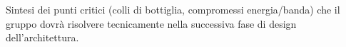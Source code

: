 \begin{center}
	Sintesi dei punti critici (colli di bottiglia, compromessi energia/banda) che il 
	gruppo dovrà risolvere tecnicamente nella successiva fase di design 
	dell'architettura. 
\end{center}